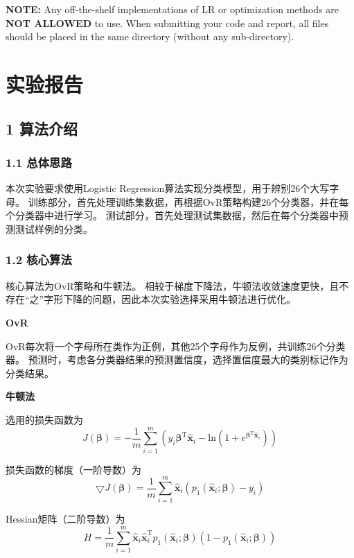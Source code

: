 \documentclass{article}
\begin{document}
\textbf{NOTE:} Any off-the-shelf implementations of LR or optimization methods are \textbf{NOT ALLOWED} to use. When submitting your code and report, all files should be placed in the same directory (without any sub-directory).


\newpage
\section*{实验报告}
\subsection*{1 算法介绍}
\subsubsection*{1.1 总体思路}
本次实验要求使用Logistic Regression算法实现分类模型，用于辨别26个大写字母。
训练部分，首先处理训练集数据，再根据OvR策略构建26个分类器，并在每个分类器中进行学习。
测试部分，首先处理测试集数据，然后在每个分类器中预测测试样例的分类。

\subsubsection*{1.2 核心算法}
核心算法为OvR策略和牛顿法。
相较于梯度下降法，牛顿法收敛速度更快，且不存在“之”字形下降的问题，因此本次实验选择采用牛顿法进行优化。

\textbf{OvR}

OvR每次将一个字母所在类作为正例，其他25个字母作为反例，共训练26个分类器。
预测时，考虑各分类器结果的预测置信度，选择置信度最大的类别标记作为分类结果。

\textbf{牛顿法}

选用的损失函数为
\begin{equation*}
    J(\bm{\beta})=-\frac{1}{m}\sum_{i=1}^{m}
    (y_i\bm{\beta}^\mathrm{T}\bm{\hat{x}}_i
    -\text{ln}(1+e^{\bm{\beta}^\mathrm{T}\bm{\hat{x}}_i}))
\end{equation*}

损失函数的梯度（一阶导数）为
\begin{equation*}
    \bigtriangledown J(\bm{\beta})
    =\frac{1}{m}\sum_{i=1}^{m}\bm{\hat{x}}_i(p_1(\bm{\hat{x}}_i;\bm{\beta})-y_i)
\end{equation*}

Hessian矩阵（二阶导数）为
\begin{equation*}
    H=\frac{1}{m}\sum_{i=1}^{m}
    \bm{\hat{x}}_i\bm{\hat{x}}_i^\mathrm{T}p_1(\bm{\hat{x}}_i;\bm{\beta})(1-p_1(\bm{\hat{x}}_i;\bm{\beta}))
\end{equation*}
\end{document}
